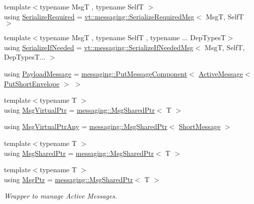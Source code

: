 \begin{DoxyCompactItemize}
\item 
{\footnotesize template$<$typename MsgT , typename SelfT $>$ }\\using \hyperlink{namespacevt_a9e60e2e8929828639383ac1d6643384d}{Serialize\+Required} = \hyperlink{structvt_1_1messaging_1_1_serialize_required_msg}{vt\+::messaging\+::\+Serialize\+Required\+Msg}$<$ MsgT, SelfT $>$
\item 
{\footnotesize template$<$typename MsgT , typename SelfT , typename ... Dep\+TypesT$>$ }\\using \hyperlink{namespacevt_a0a4ad8c256fcffa564e9fa7800e4b495}{Serialize\+If\+Needed} = \hyperlink{structvt_1_1messaging_1_1_serialize_if_needed_msg}{vt\+::messaging\+::\+Serialize\+If\+Needed\+Msg}$<$ MsgT, SelfT, Dep\+Types\+T... $>$
\item 
using \hyperlink{namespacevt_a89a92229c5622b855c02c549f83a1a68}{Payload\+Message} = \hyperlink{structvt_1_1messaging_1_1_put_message_component}{messaging\+::\+Put\+Message\+Component}$<$ \hyperlink{namespacevt_a00eb67bd138395b6a4f744fab3fa0678}{Active\+Message}$<$ \hyperlink{namespacevt_a8d7a7de9e76bfea1600009a775b7298c}{Put\+Short\+Envelope} $>$ $>$
\item 
{\footnotesize template$<$typename T $>$ }\\using \hyperlink{namespacevt_a82b5c92ea7ca3ddd2e8a2e27df87fa1a}{Msg\+Virtual\+Ptr} = \hyperlink{structvt_1_1messaging_1_1_msg_shared_ptr}{messaging\+::\+Msg\+Shared\+Ptr}$<$ T $>$
\item 
using \hyperlink{namespacevt_a54674b9f819f4f3a652c6f78d9b62aaf}{Msg\+Virtual\+Ptr\+Any} = \hyperlink{structvt_1_1messaging_1_1_msg_shared_ptr}{messaging\+::\+Msg\+Shared\+Ptr}$<$ \hyperlink{namespacevt_a1125ac1da6c0bbf141e0ea0739d7602d}{Short\+Message} $>$
\item 
{\footnotesize template$<$typename T $>$ }\\using \hyperlink{namespacevt_ab2b3d506ec8e8d1540aede826d84a239}{Msg\+Shared\+Ptr} = \hyperlink{structvt_1_1messaging_1_1_msg_shared_ptr}{messaging\+::\+Msg\+Shared\+Ptr}$<$ T $>$
\item 
{\footnotesize template$<$typename T $>$ }\\using \hyperlink{namespacevt_a9f5ebd62ee9d6dd8829e3e1cc4f858e9}{Msg\+Ptr} = \hyperlink{structvt_1_1messaging_1_1_msg_shared_ptr}{messaging\+::\+Msg\+Shared\+Ptr}$<$ T $>$
\begin{DoxyCompactList}\small\item\em Wrapper to manage Active Messages. \end{DoxyCompactList}\item 

\end{DoxyCompactItemize}
